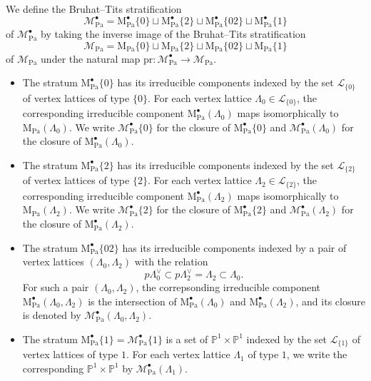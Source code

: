 \documentclass[10pt]{amsart}
\numberwithin{equation}{section}
\theoremstyle{definition}
\def\Pa{\mathrm{Pa}}
\def\calL{\mathcal{L}}
\def\calM{\mathcal{M}}
\def\PP{\mathbb{P}}
\def\rmM{\mathrm{M}}
\begin{document}
We define the Bruhat--Tits stratification 
\begin{equation*}
\calM^{\bullet}_{\Pa}= {\rmM}^{\bullet}_{\Pa}\{0\}\sqcup  \rmM^{\bullet}_{\Pa}\{2\} \sqcup  \rmM^{\bullet}_{\Pa}\{02\} \sqcup \rmM^{\bullet}_{\Pa}\{1\}
\end{equation*}
of $\calM^{\bullet}_{\Pa}$ by taking the inverse image of the  Bruhat--Tits stratification 
\begin{equation*}
\calM_{\Pa}= \rmM_{\Pa}\{0\}\sqcup  \rmM_{\Pa}\{2\} \sqcup  \rmM_{\Pa}\{02\} \sqcup \rmM_{\Pa}\{1\}
\end{equation*}
of $\calM_{\Pa}$ under the natural map $\mathrm{pr}:\calM^{\bullet}_{\Pa}\rightarrow \calM_{\Pa}$. 
\begin{itemize}
\item The stratum $\rmM^{\bullet}_{\Pa}\{0\}$ has its irreducible components indexed by the set $\calL_{\{0\}}$ of vertex lattices of type $\{0\}$. For each vertex lattice $\Lambda_{0}\in \calL_{\{0\}}$, the corresponding irreducible component $\rmM^{\bullet}_{\Pa}(\Lambda_{0})$ maps isomorphically to $\rmM_{\Pa}(\Lambda_{0})$. We write $\calM^{\bullet}_{\Pa}\{0\}$ for the closure of $\rmM^{\bullet}_{\Pa}\{0\}$ and  $\calM^{\bullet}_{\Pa}(\Lambda_{0})$ for the closure of $\rmM^{\bullet}_{\Pa}(\Lambda_{0})$.

\item The stratum $\rmM^{\bullet}_{\Pa}\{2\}$ has its irreducible components indexed by the set $\calL_{\{2\}}$ of vertex lattices of type $\{2\}$. For each vertex lattice $\Lambda_{2}\in \calL_{\{2\}}$, the corresponding irreducible component $\rmM^{\bullet}_{\Pa}(\Lambda_{2})$ maps isomorphically to $\rmM_{\Pa}(\Lambda_{2})$. We write $\calM^{\bullet}_{\Pa}\{2\}$ for the closure of $\rmM^{\bullet}_{\Pa}\{2\}$ and  $\calM^{\bullet}_{\Pa}(\Lambda_{2})$ for the closure of $\rmM^{\bullet}_{\Pa}(\Lambda_{2})$.

\item The stratum $\rmM^{\bullet}_{\Pa}\{02\}$ has its irreducible components indexed by a pair of vertex lattices $(\Lambda_{0}, \Lambda_{2})$ with the relation
\begin{equation*}
p\Lambda^{\vee}_{0}\subset p\Lambda^{\vee}_{2}=\Lambda_{2}\subset \Lambda_{0}. 
\end{equation*}
For such a pair $(\Lambda_{0}, \Lambda_{2})$, the correpsonding irreducible component $\rmM^{\bullet}_{\Pa}(\Lambda_{0}, \Lambda_{2})$ is the intersection of $\rmM^{\bullet}_{\Pa}(\Lambda_{0})$ and $\rmM^{\bullet}_{\Pa}(\Lambda_{2})$, and its closure is denoted by $\calM^{\bullet}_{\Pa}(\Lambda_{0}, \Lambda_{2})$.

\item The stratum $\rmM^{\bullet}_{\Pa}\{1\}=\calM^{\bullet}_{\Pa}\{1\}$ is a set of $\PP^{1}\times\PP^{1}$ indexed by the set  $\calL_{\{1\}}$ of vertex lattices of type $1$.  For each vertex lattice $\Lambda_{1}$ of type $1$, we write the corresponding $\PP^{1}\times\PP^{1}$ by $\calM^{\bullet}_{\Pa}(\Lambda_{1})$. 
\end{itemize}
\end{document}
